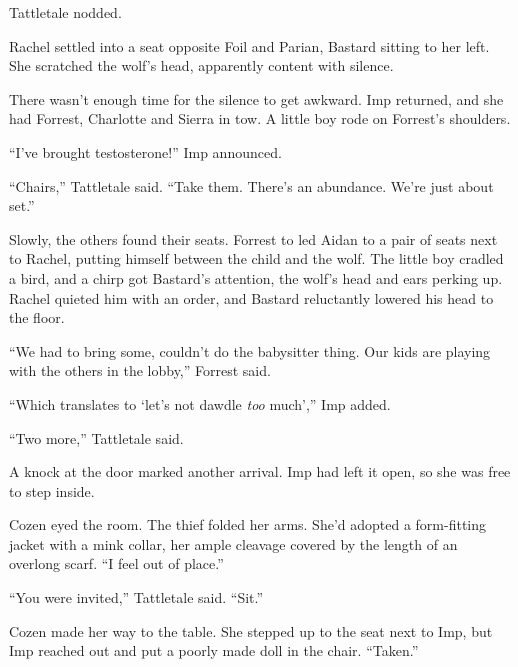 Tattletale nodded.



Rachel settled into a seat opposite Foil and Parian, Bastard sitting to her left.  She scratched the wolf's head, apparently content with silence.



There wasn't enough time for the silence to get awkward.  Imp returned, and she had Forrest, Charlotte and Sierra in tow.  A little boy rode on Forrest's shoulders.



``I've brought testosterone!'' Imp announced.



``Chairs,'' Tattletale said.  ``Take them.  There's an abundance.  We're just about set.''



Slowly, the others found their seats.  Forrest to led Aidan to a pair of seats next to Rachel, putting himself between the child and the wolf.  The little boy cradled a bird, and a chirp got Bastard's attention, the wolf's head and ears perking up.  Rachel quieted him with an order, and Bastard reluctantly lowered his head to the floor.



``We had to bring some, couldn't do the babysitter thing.  Our kids are playing with the others in the lobby,'' Forrest said.



``Which translates to `let's not dawdle \emph{too} much','' Imp added.



``Two more,'' Tattletale said.



A knock at the door marked another arrival.  Imp had left it open, so she was free to step inside.



Cozen eyed the room.  The thief folded her arms.  She'd adopted a form-fitting jacket with a mink collar, her ample cleavage covered by the length of an overlong scarf.  ``I feel out of place.''



``You were invited,'' Tattletale said.  ``Sit.''



Cozen made her way to the table.  She stepped up to the seat next to Imp, but Imp reached out and put a poorly made doll in the chair.  ``Taken.''



